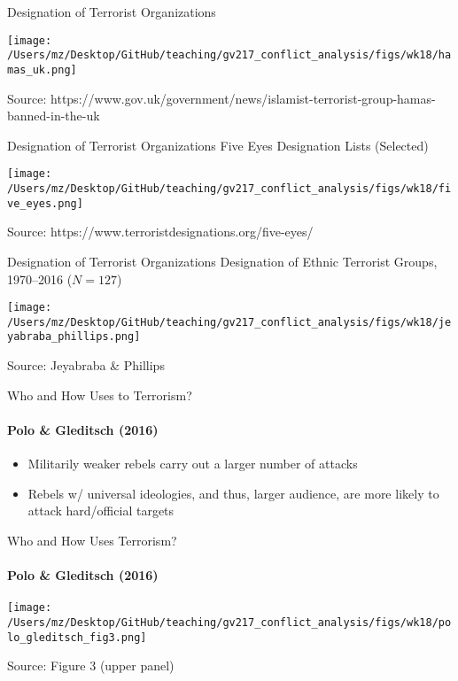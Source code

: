\documentclass{beamer}
\begin{document}
\begin{frame}{Designation of Terrorist Organizations}
    \pause
    \begin{center}
        \texttt{[image: /Users/mz/Desktop/GitHub/teaching/gv217\_conflict\_analysis/figs/wk18/hamas\_uk.png]}
    \end{center}
    \footnotesize Source: https://www.gov.uk/government/news/islamist-terrorist-group-hamas-banned-in-the-uk
\end{frame}

\begin{frame}{Designation of Terrorist Organizations}
    \pause
    Five Eyes Designation Lists (Selected)
    \begin{center}
        \texttt{[image: /Users/mz/Desktop/GitHub/teaching/gv217\_conflict\_analysis/figs/wk18/five\_eyes.png]}
    \end{center}
    \footnotesize Source: https://www.terroristdesignations.org/five-eyes/
\end{frame}

\begin{frame}{Designation of Terrorist Organizations}
    \pause
    Designation of Ethnic Terrorist Groups, 1970--2016 (\(N = 127\))
    \begin{center}
        \texttt{[image: /Users/mz/Desktop/GitHub/teaching/gv217\_conflict\_analysis/figs/wk18/jeyabraba\_phillips.png]}
    \end{center}
    \footnotesize Source: Jeyabraba \& Phillips
\end{frame}

\begin{frame}{Who and How Uses to Terrorism?}
\framesubtitle{Polo \& Gleditsch (2016)}
    \begin{itemize}
        \pause\item Militarily weaker rebels carry out a larger number of attacks
        \pause\item Rebels w/ universal ideologies, and thus, larger audience, are more likely to attack hard/official targets
\end{itemize}
\end{frame}

\begin{frame}{Who and How Uses Terrorism?}
\framesubtitle{Polo \& Gleditsch (2016)}
    \begin{center}
        \texttt{[image: /Users/mz/Desktop/GitHub/teaching/gv217\_conflict\_analysis/figs/wk18/polo\_gleditsch\_fig3.png]}
    \end{center}
    \footnotesize Source: Figure 3 (upper panel)
\end{frame}
\end{document}
